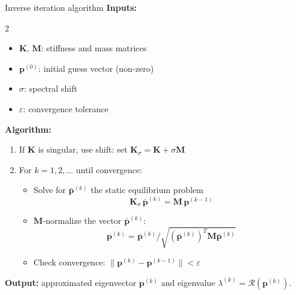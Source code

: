 \documentclass[aspectratio=169]{beamer}
\begin{document}
\begin{frame}{Inverse iteration algorithm}
  \small
  \textbf{Inputs:}
  \vspace{-0.3cm}
  \begin{multicols}{2}
    \begin{itemize}
      \item \(\mathbf K \), \(\mathbf M \): stiffness and mass matrices
      \item \( \mathbf p^{(0)} \): initial guess vector (non-zero)
      \item \( \sigma \): spectral shift
      \item \( \varepsilon \): convergence tolerance
    \end{itemize}
  \end{multicols}
  \vspace{-0.3cm}

  \textbf{Algorithm:}
  \begin{enumerate}
    \item If $\mathbf K$ is singular, use shift: set \( \mathbf K_\sigma =\mathbf K + \sigma\mathbf M \)
    \item For \( k = 1, 2, \dots \) until convergence:
          \begin{itemize}
            \item Solve for $\bar{\mathbf p}^{(k)}$ the static equilibrium problem  $$\mathbf K_\sigma \, \bar{\mathbf p}^{(k)} =\mathbf M \, \mathbf p^{(k-1)} $$
            \item $\mathbf M$-normalize the vector $\bar{\mathbf p}^{(k)}$:
                  $$\mathbf p^{(k)} = \bar{\mathbf p}^{(k)} / \sqrt{(\bar{\mathbf p}^{(k)})^T \mathbf M \bar{\mathbf p}^{(k)}}$$
            \item Check convergence: \( \|\mathbf p^{(k)} - \mathbf p^{(k-1)}\| < \varepsilon \)
          \end{itemize}
  \end{enumerate}
  \textbf{Output:} approximated eigenvector \( \mathbf p^{(k)} \) and eigenvalue \( \lambda^{(k)} = \mathcal R(\mathbf p^{(k)}) \).
\end{frame}
\end{document}
